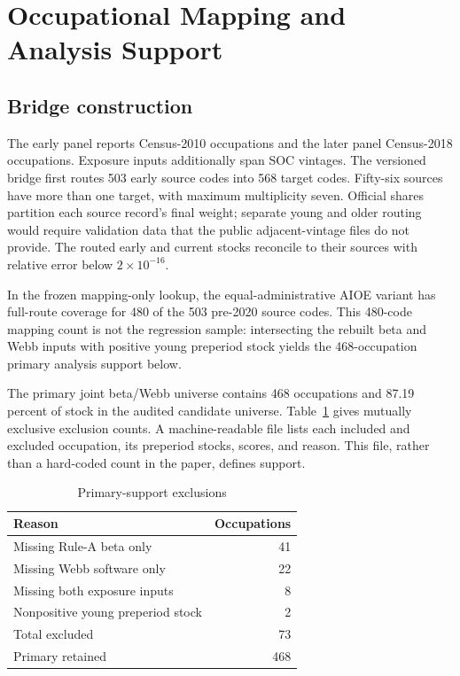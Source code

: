 \section{Occupational Mapping and Analysis Support}\label{app:mapping}

\subsection{Bridge construction}

The early panel reports Census-2010 occupations and the later panel Census-2018 occupations.  Exposure inputs additionally span SOC vintages.  The versioned bridge first routes 503 early source codes into 568 target codes.  Fifty-six sources have more than one target, with maximum multiplicity seven.  Official shares partition each source record's final weight; separate young and older routing would require validation data that the public adjacent-vintage files do not provide.  The routed early and current stocks reconcile to their sources with relative error below $2\times10^{-16}$.

In the frozen mapping-only lookup, the equal-administrative AIOE variant has full-route coverage for 480 of the 503 pre-2020 source codes.  This 480-code mapping count is not the regression sample: intersecting the rebuilt beta and Webb inputs with positive young preperiod stock yields the 468-occupation primary analysis support below.

The primary joint beta/Webb universe contains 468 occupations and 87.19 percent of stock in the audited candidate universe.  Table~\ref{tab:app_exclusions} gives mutually exclusive exclusion counts.  A machine-readable file lists each included and excluded occupation, its preperiod stocks, scores, and reason.  This file, rather than a hard-coded count in the paper, defines support.

\begin{table}[!htbp]
\centering
\caption{Primary-support exclusions}\label{tab:app_exclusions}
\begin{tabular}{lr}
\toprule
Reason & Occupations \\
\midrule
Missing Rule-A beta only & 41 \\
Missing Webb software only & 22 \\
Missing both exposure inputs & 8 \\
Nonpositive young preperiod stock & 2 \\
\midrule
Total excluded & 73 \\
Primary retained & 468 \\
\bottomrule
\end{tabular}
\end{table}

